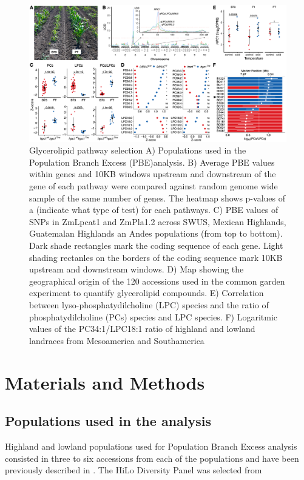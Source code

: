 \documentclass[9pt,twocolumn,twoside,lineno]{gsajnl}
\begin{document}
\begin{figure}[!ht]
\begin{center}
\includegraphics[width=0.8\paperwidth]{Figures/Fig_3.png}
\caption{Glycerolipid pathway selection 
A) Populations used in the Population Branch Excess (PBE)analysis. 
B) Average PBE values within genes and 10KB windows upstream and downstream of the gene of each pathway were compared against random genome wide sample of the same number of genes. The heatmap shows p-values of a (indicate what type of test) for each pathways. 
C) PBE values of SNPs in ZmLpcat1 and ZmPla1.2 across SWUS, Mexican Highlands, Guatemalan Highlands an Andes populations (from top to bottom). Dark shade rectangles mark the coding sequence of each gene. Light shading rectanles on the borders of the coding sequence mark 10KB upstream and downstream windows. 
D) Map showing the geographical origin of the 120 accessions used in the common garden experiment to quantify glycerolipid compounds.
E) Correlation between  lyso-phosphatydilcholine (LPC) species and the ratio of  phosphatydilcholine (PCs) species and LPC species. 
F) Logaritmic values of the PC34:1/LPC18:1 ratio of highland and lowland landraces from Mesoamerica and Southamerica}
\label{Fig3}
\end{center}
\end{figure}  

\section{Materials and Methods}
\label{sec:materials:methods}

\subsection{Populations used in the analysis } 
Highland and lowland populations used for Population Branch Excess analysis consisted in three to six accessions from each of the populations and have been previously described in \cite{Wang2020-mp, Wang2017-bc}. 
The HiLo Diversity Panel was selected from
\end{document}
